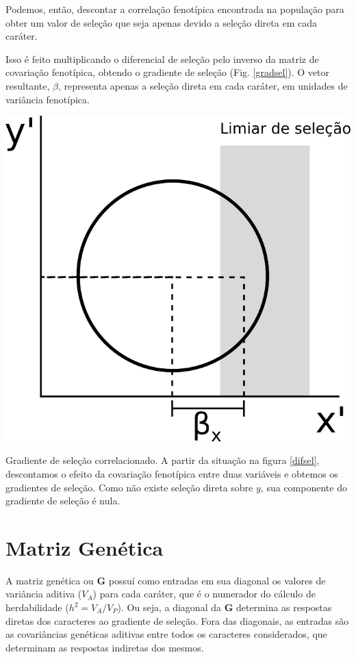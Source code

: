 \documentclass[portuges,]{tufte-handout}
\begin{document}
Podemos, então, descontar a correlação fenotípica encontrada na
população para obter um valor de seleção que seja apenas devido a
seleção direta em cada caráter.

Isso é feito multiplicando o diferencial de seleção pelo inverso da
matriz de covariação fenotípica, obtendo o gradiente de seleção (Fig.
\ref{gradsel}). O vetor resultante, \(\beta\), representa apenas a
seleção direta em cada caráter, em unidades de variância fenotípica.

\begin{marginfigure}
\includegraphics{./figuras/gradientedeselecao.png}
\caption{Gradiente de seleção correlacionado. A partir da
situação na figura \ref{difsel}, descontamos o efeito da covariação
fenotípica entre duas variáveis e obtemos os gradientes de seleção. Como
não existe seleção direta sobre $y$, sua componente do gradiente de
seleção é nula.}
\label{gradsel}
\end{marginfigure}

\section{Matriz Genética}\label{matriz-genuxe9tica}

A matriz genética ou \(\mathbf{G}\) possuí como entradas em sua diagonal
os valores de variância aditiva (\(V_A\)) para cada caráter, que é o
numerador do cálculo de herdabilidade (\(h^2 = V_A/V_P\)). Ou seja, a
diagonal da \(\mathbf{G}\) determina as respostas diretas dos caracteres
ao gradiente de seleção. Fora das diagonais, as entradas são as
covariâncias genéticas aditivas entre todos os caracteres considerados,
que determinam as respostas indiretas dos mesmos.
\end{document}
